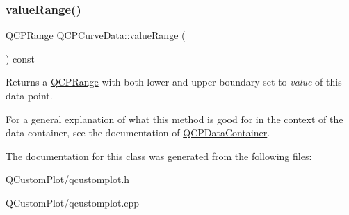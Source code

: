 \subsubsection{\texorpdfstring{value\+Range()}{valueRange()}}
{\footnotesize\ttfamily \mbox{\hyperlink{class_q_c_p_range}{Q\+C\+P\+Range}} Q\+C\+P\+Curve\+Data\+::value\+Range (\begin{DoxyParamCaption}{ }\end{DoxyParamCaption}) const\hspace{0.3cm}{\ttfamily [inline]}}

Returns a \mbox{\hyperlink{class_q_c_p_range}{Q\+C\+P\+Range}} with both lower and upper boundary set to {\itshape value} of this data point.

For a general explanation of what this method is good for in the context of the data container, see the documentation of \mbox{\hyperlink{class_q_c_p_data_container}{Q\+C\+P\+Data\+Container}}. 

The documentation for this class was generated from the following files\+:\begin{DoxyCompactItemize}
\item 
Q\+Custom\+Plot/qcustomplot.\+h\item 
Q\+Custom\+Plot/qcustomplot.\+cpp\end{DoxyCompactItemize}
